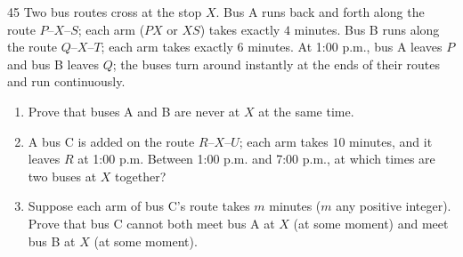 \begin{probbox}{45}{}
Two bus routes cross at the stop $X$. Bus A runs back and forth along the route $P\text{--}X\text{--}S$; each arm ($PX$ or $XS$) takes exactly $4$ minutes. Bus B runs along the route $Q\text{--}X\text{--}T$; each arm takes exactly $6$ minutes. At 1:00 p.m., bus A leaves $P$ and bus B leaves $Q$; the buses turn around instantly at the ends of their routes and run continuously.
\begin{enumerate}[label=\alph*),leftmargin=1.6em,itemsep=1pt]
\item Prove that buses A and B are never at $X$ at the same time.
\item A bus C is added on the route $R\text{--}X\text{--}U$; each arm takes $10$ minutes, and it leaves $R$ at 1:00 p.m. Between 1:00 p.m. and 7:00 p.m., at which times are two buses at $X$ together?
\item Suppose each arm of bus C's route takes $m$ minutes ($m$ any positive integer). Prove that bus C cannot both meet bus A at $X$ (at some moment) and meet bus B at $X$ (at some moment).
\end{enumerate}
\end{probbox}
